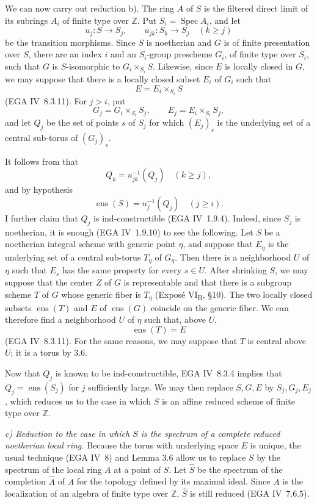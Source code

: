 We can now carry out reduction b). The ring \(A\) of \(S\) is the
filtered direct limit of its subrings \(A_i\) of finite type over
\(\mathbb Z\). Put \(S_i=\operatorname{Spec}A_i\), and let
\[
  u_j:S\longrightarrow S_j,\qquad
  u_{jk}:S_k\longrightarrow S_j\quad(k\geq j)
\]
be the transition morphisms. Since \(S\) is noetherian and \(G\) is
of finite presentation over \(S\), there are an index \(i\) and an
\(S_i\)-group prescheme \(G_i\), of finite type over \(S_i\), such
that \(G\) is \(S\)-isomorphic to \(G_i\times_{S_i}S\). Likewise,
since \(E\) is locally closed in \(G\), we may suppose that there is
a locally closed subset \(E_i\) of \(G_i\) such that
\[
  E=E_i\times_{S_i}S
\]
(EGA IV~8.3.11). For \(j>i\), put
\[
  G_j=G_i\times_{S_i}S_j,\qquad
  E_j=E_i\times_{S_i}S_j,
\]
and let \(Q_j\) be the set of points \(s\) of \(S_j\) for which
\((E_j)_s\) is the underlying set of a central sub-torus of
\((G_j)_s\).

It follows from  that
\[
  Q_k=u_{jk}^{-1}(Q_j)\quad(k\geq j),
\]
and by hypothesis
\[
  \operatorname{ens}(S)=u_j^{-1}(Q_j)\quad(j\geq i).
\]
I further claim that \(Q_j\) is ind-constructible
(EGA IV~1.9.4). Indeed, since \(S_j\) is noetherian, it is enough
(EGA IV~1.9.10) to see the following. Let \(S\) be a noetherian
integral scheme with generic point \(\eta\), and suppose that
\(E_\eta\) is the underlying set of a central sub-torus \(T_\eta\)
of \(G_\eta\). Then there is a neighborhood \(U\) of \(\eta\) such
that \(E_s\) has the same property for every \(s\in U\). After
shrinking \(S\), we may suppose that the center \(Z\) of \(G\) is
representable and that there is a subgroup scheme \(T\) of \(G\)
whose generic fiber is \(T_\eta\)
(Exposé VI\textsubscript{B}, \S10). The two locally closed subsets
\(\operatorname{ens}(T)\) and \(E\) of \(\operatorname{ens}(G)\)
coincide on the generic fiber. We can therefore find a neighborhood
\(U\) of \(\eta\) such that, above \(U\),
\[
  \operatorname{ens}(T)=E
\]
(EGA IV~8.3.11). For the same reasons, we may suppose that \(T\) is
central above \(U\); it is a torus by 3.6.

Now that \(Q_j\) is known to be ind-constructible, EGA IV~8.3.4
implies that \(Q_j=\operatorname{ens}(S_j)\) for \(j\) sufficiently
large. We may then replace \(S,G,E\) by \(S_j,G_j,E_j\), which
reduces us to the case in which \(S\) is an affine reduced scheme of
finite type over \(\mathbb Z\).

\smallskip
\noindent\textit{c) Reduction to the case in which \(S\) is the
spectrum of a complete reduced noetherian local ring.}\quad
Because the torus with underlying space \(E\) is unique, the usual
technique (EGA IV~8) and Lemma 3.6 allow us to replace \(S\) by the
spectrum of the local ring \(A\) at a point of \(S\). Let
\(\widehat S\) be the spectrum of the completion \(\widehat A\) of
\(A\) for the topology defined by its maximal ideal. Since \(A\) is
the localization of an algebra of finite type over \(\mathbb Z\),
\(\widehat S\) is still reduced (EGA IV~7.6.5).

